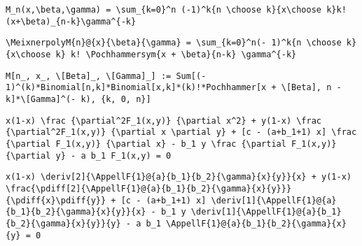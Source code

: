 \newsavebox\CMT
\begin{lrbox}{\CMT}
 \begin{minipage}[t]{0.82\textwidth}
  \lstinline[language={[latex]TeX},mathescape,breaklines=true]"M_n(x,\beta,\gamma) = \sum_{k=0}^n (-1)^k{n \choose k}{x\choose k}k!(x+\beta)_{n-k}\gamma^{-k}"
 \end{minipage}
\end{lrbox}
\newsavebox\CMST
\begin{lrbox}{\CMST}
 \begin{minipage}[t]{0.82\textwidth}
  \lstinline[language={[latex]TeX},mathescape,breaklines=true]"\MeixnerpolyM{n}@{x}{\beta}{\gamma} = \sum_{k=0}^n(- 1)^k{n \choose k}{x\choose k} k! \Pochhammersym{x + \beta}{n-k} \gamma^{-k}"
 \end{minipage}
\end{lrbox}
\newsavebox\CMMM
\begin{lrbox}{\CMMM}
 \begin{minipage}[t]{0.82\textwidth}
  \lstinline[language={[latex]TeX},mathescape,breaklines=true]"M[n_, x_, \[Beta]_, \[Gamma]_] := Sum[(- 1)^(k)*Binomial[n,k]*Binomial[x,k]*(k)!*Pochhammer[x + \[Beta], n - k]*\[Gamma]^(- k), {k, 0, n}]"
 \end{minipage}
\end{lrbox}
\newsavebox\CMMA
\begin{lrbox}{\CMMA}
 \begin{minipage}[t]{0.82\textwidth}
  \lstinline[language={[latex]TeX},mathescape,breaklines=true]""
 \end{minipage}
\end{lrbox}
\newsavebox\CNT
\begin{lrbox}{\CNT}
 \begin{minipage}[t]{0.82\textwidth}
  \lstinline[language={[latex]TeX},mathescape,breaklines=true]"x(1-x) \frac {\partial^2F_1(x,y)} {\partial x^2} + y(1-x) \frac {\partial^2F_1(x,y)} {\partial x \partial y} + [c - (a+b_1+1) x] \frac {\partial F_1(x,y)} {\partial x} - b_1 y \frac {\partial F_1(x,y)} {\partial y} - a b_1 F_1(x,y) = 0"
 \end{minipage}
\end{lrbox}
\newsavebox\CNST
\begin{lrbox}{\CNST}
 \begin{minipage}[t]{0.82\textwidth}
  \lstinline[language={[latex]TeX},mathescape,breaklines=true]"x(1-x) \deriv[2]{\AppellF{1}@{a}{b_1}{b_2}{\gamma}{x}{y}}{x} + y(1-x) \frac{\pdiff[2]{\AppellF{1}@{a}{b_1}{b_2}{\gamma}{x}{y}}}{\pdiff{x}\pdiff{y}} + [c - (a+b_1+1) x] \deriv[1]{\AppellF{1}@{a}{b_1}{b_2}{\gamma}{x}{y}}{x} - b_1 y \deriv[1]{\AppellF{1}@{a}{b_1}{b_2}{\gamma}{x}{y}}{y} - a b_1 \AppellF{1}@{a}{b_1}{b_2}{\gamma}{x}{y} = 0"
 \end{minipage}
\end{lrbox}
